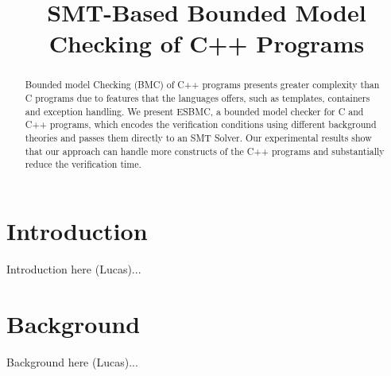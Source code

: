 \documentclass[a4paper]{llncs}
\newcommand{\comment}[1]{}
\begin{document}

\title{SMT-Based Bounded Model Checking of C++ Programs}
\comment{
\author{Lucas Cordeiro$^1$ \and
	Jeremy Morse$^2$   \and
	Denis Nicole$^2$   \and
	Bernd Fischer$^2$}
\authorrunning{Lucas Cordeiro, Jeremy Morse, Denis Nicole, Bernd Fischer}
\institute{
  $^1$ Electronic and Information Research Center, %
  Federal University of Amazonas, Brazil\\
  $^2$ Electronics and Computer Science, %
  University of Southampton, UK\\
  \url{esbmc@ecs.soton.ac.uk}
}
}

\maketitle

\begin{abstract}
Bounded model Checking (BMC) of C++ programs presents greater complexity than C programs due to features that the languages offers, such as templates, containers and exception handling. We present ESBMC, a bounded model checker for C and C++ programs, which encodes the verification conditions using different background theories and passes them directly to an SMT Solver. Our experimental results show that our approach can handle more constructs of the C++ programs and substantially reduce the verification time. 
\end{abstract}

\section{Introduction}
%
Introduction here (Lucas)...

\section{Background}
%
Background here (Lucas)...
\end{document}
